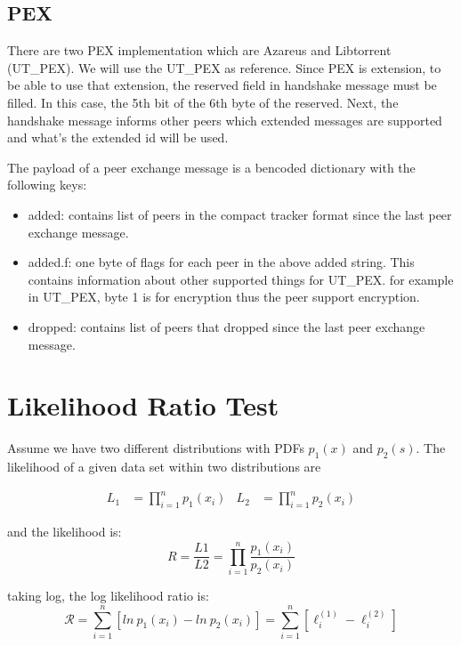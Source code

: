 \begin{appendices}
\section{PEX}

There are two PEX implementation which are Azareus and Libtorrent (UT\_PEX).
We will use the UT\_PEX as reference. 
Since PEX is extension, to be able to use that extension, the reserved field in handshake message must be filled.
In this case, the 5th bit of the 6th byte of the reserved. 
Next, the handshake message informs other peers which extended messages are supported and what's the extended id will be used.   

The payload of a peer exchange message is a bencoded dictionary with the following keys:
\begin{itemize}
	\item added: contains list of peers in the compact tracker format since the last peer exchange message.
	\item added.f: one byte of flags for each peer in the above added string. This contains information about other supported things for UT\_PEX.  
	for example in UT\_PEX, byte 1 is for encryption thus the peer support encryption. 
	\item dropped:  contains list of peers that dropped since the last peer exchange message.
\end{itemize}


\chapter{Likelihood Ratio Test}
Assume we have two different distributions with PDFs $p_1(x)$ and $p_2(s)$.
The likelihood of a given data set within two distributions are 

\begin{align}
	L_1 &= \prod_{i=1}^{n} p_1(x_i)  &  L_2 &= \prod_{i=1}^{n} p_2(x_i) 
\end{align}

and the likelihood is: 
\begin{equation}
	R = \frac{L1}{L2} = \prod_{i=1}^{n} \frac{p_1(x_i)}{p_2(x_i)}
\end{equation}

taking log, the log likelihood ratio is:
\begin{equation}
	\mathcal{R} = \sum_{i=1}^{n} [ln \:  p_1(x_i) - ln \: p_2(x_i)] = \sum_{i=1}^{n} [ \ell_{i}^{(1)} - \ell_{i}^{(2)} ]
\end{equation}


\end{appendices}
